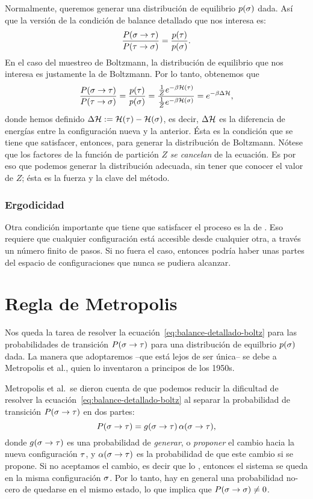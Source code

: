 Normalmente, queremos generar una distribución de equilibrio $p(\ss)$ dada. Así que la versión de la condición de balance detallado que nos interesa es:
\begin{equation}
\frac{P(\ss \to \tt)}{P(\tt \to \ss)} =  \frac{p(\tt)}{p(\ss)}.
\label{eq:balance-detallado-nuevo}
\end{equation}
En el caso del muestreo de Boltzmann, la distribución de equilibrio que nos interesa es justamente la de Boltzmann. Por lo tanto, obtenemos que
\begin{equation}
\frac{P(\ss \to \tt)}{P(\tt \to \ss)} =  \frac{p(\tt)}{p(\ss)} = \frac{\frac{1}{Z} e^{-\beta \HH(\tt)}}{\frac{1}{Z} e^{-\beta \HH(\ss)}} = e^{-\beta \Delta \HH},
\label{eq:balance-detallado-boltz}
\end{equation}
donde hemos definido \( \Delta \HH \defeq \HH(\tt) - \HH(\ss) \), es decir, $\Delta \HH$ es la diferencia de energías entre la configuración nueva y la anterior.
Ésta es la condición que se tiene que satisfacer, entonces, para generar la distribución de Boltzmann.  Nótese que los factores de la función de partición $Z$ \emph{se cancelan} de la ecuación. Es por eso que podemos generar la distribución adecuada, sin tener que conocer el valor de $Z$; ésta es la fuerza y la clave del método.


\subsubsection{Ergodicidad}
Otra condición importante que tiene que satisfacer el proceso es la de . Eso requiere que cualquier configuración está accesible
desde cualquier otra, a través un número finito de pasos. Si no fuera el caso, entonces podría haber unas partes del espacio de configuraciones que nunca se
pudiera alcanzar.


\section{Regla de Metropolis}
Nos queda la tarea de resolver la ecuación~\eqref{eq:balance-detallado-boltz} para las probabilidades de transición $P(\ss \to \tt)$ para una distribución de equilbrio $p(\ss)$ dada. La manera que adoptaremos --que está lejos de ser única-- se debe a Metropolis et al., quien lo inventaron a principos de los 1950s.

Metropolis et al.~se dieron cuenta de que podemos reducir la dificultad de resolver la ecuación~\eqref{eq:balance-detallado-boltz} al separar la probabilidad de transición $P(\ss \to \tt)$ en dos partes:
\begin{equation}
 P(\ss \to \tt) = g(\ss \to \tt) \, \alpha(\ss \to \tt),
\end{equation}
donde $g(\ss \to \tt)$ es una probabilidad de \emph{generar}, o \emph{proponer} el cambio hacia la nueva configuración $\tt$, y $\alpha(\ss \to \tt)$ es la probabilidad de que  este cambio si se propone.  Si no aceptamos el cambio, es decir que lo , entonces el sistema se queda en la misma configuración $\ss$. Por lo tanto, hay en general una probabilidad no-cero de quedarse en el mismo estado, lo que implica que $P(\ss \to \ss) \neq 0$.

